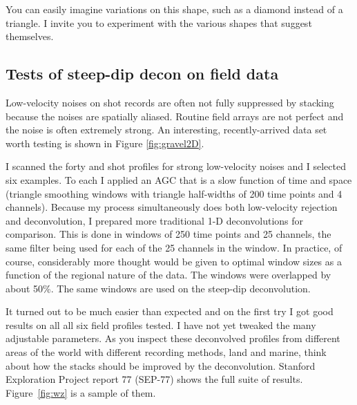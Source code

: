 \par
You can easily imagine variations on this shape,
such as a diamond instead of a triangle.
I invite you to experiment with the various shapes that suggest themselves.

\subsection{Tests of steep-dip decon on field data}
\par
Low-velocity noises on shot records
are often not fully suppressed by stacking
because the noises are spatially aliased.
Routine field arrays are not perfect
and the noise is often extremely strong.
An interesting, recently-arrived data set
worth testing is shown in Figure \ref{fig:gravel2D}.


\par
I scanned the forty  and  shot profiles
for strong low-velocity noises and I selected six examples.
To each I applied an AGC that is a slow function of time and space
(triangle smoothing windows with triangle half-widths of 200
time points and 4 channels).
Because my process simultaneously does
both low-velocity rejection and deconvolution,
I prepared more traditional 1-D deconvolutions for comparison.
This is done in windows of 250 time points and 25 channels,
the same filter being used for each of the 25 channels in the window.
In practice, of course, considerably more thought would be given
to optimal window sizes as a function of the regional nature of the data.
The windows were overlapped by about 50\%.
The same windows are used on the steep-dip deconvolution.

\par
It turned out to be much easier than expected
and on the first try
I got good results on all all six field profiles tested.
I have not yet tweaked the many adjustable parameters.
As you inspect these
deconvolved profiles from different areas of the world
with different recording methods, land and marine,
think about how the stacks should be improved by the deconvolution.
Stanford Exploration Project report 77 (SEP-77) shows the full suite of results.
Figure~\ref{fig:wz} is a sample of them.

